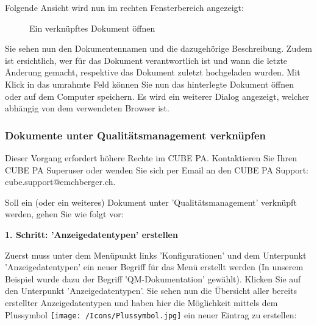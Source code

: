 \pagebreak
Folgende Ansicht wird nun im rechten Fensterbereich angezeigt:

\begin{figure}[H]
\caption{Ein verknüpftes Dokument öffnen}
\end{figure}

Sie sehen nun den Dokumentennamen und die dazugehörige Beschreibung. Zudem ist ersichtlich, wer für das Dokument verantwortlich ist und wann die letzte Änderung gemacht, respektive  das Dokument zuletzt hochgeladen wurden. Mit Klick in das umrahmte Feld können Sie nun das hinterlegte Dokument öffnen oder auf dem Computer speichern. Es wird ein weiterer Dialog angezeigt, welcher abhängig von dem verwendeten Browser ist.

\subsubsection{Dokumente unter Qualitätsmanagement verknüpfen}
\label{bkm:Ref912000789}

Dieser Vorgang erfordert höhere Rechte im CUBE PA. Kontaktieren Sie Ihren CUBE PA Superuser oder wenden Sie sich per Email an den CUBE PA Support: {\color{red} cube.support@emchberger.ch}.

\vspace{\baselineskip}

Soll ein (oder ein weiteres) Dokument unter 'Qualitätsmanagement' verknüpft werden, gehen Sie wie folgt vor:

\vspace{\baselineskip}

\textbf{1. Schritt: 'Anzeigedatentypen' erstellen}

Zuerst muss unter dem Menüpunkt links 'Konfigurationen' und dem Unterpunkt 'Anzeigedatentypen' ein neuer Begriff für das Menü erstellt werden (In unserem Beispiel wurde dazu der Begriff 'QM-Dokumentation' gewählt). Klicken Sie auf den Unterpunkt 'Anzeigedatentypen'. Sie sehen nun die Übersicht aller bereits erstellter Anzeigedatentypen und haben hier die Möglichkeit mittels dem Plussymbol \texttt{[image: /Icons/Plussymbol.jpg]}  ein neuer Eintrag zu erstellen:


